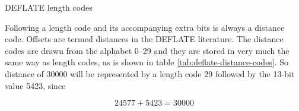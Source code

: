 \begin{table}
  \caption{DEFLATE length codes}
  \label{tab:deflate-length-codes}
\end{table}

Following a length code and its accompanying extra bits is always a
distance code. Offsets are termed distances in the DEFLATE
literature. The distance codes are drawn from the alphabet 0--29 and
they are stored in very much the same way as length codes, as is shown
in table \ref{tab:deflate-distance-codes}. So distance of $30000$ will
be represented by a length code 29 followed by the 13-bit value
5423, since

\begin{equation*}
  24577 + 5423 = 30000
\end{equation*}

\begin{table}


\end{table}
